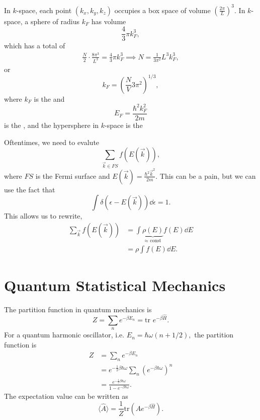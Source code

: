 \documentclass{article}
\numberwithin{equation}{section}
\begin{document}
In $k$-space, each point $(k_x,k_y,k_z)$ occupies a box space of volume $\left(\frac{2\pi}{L}\right)^3.$ In $k$-space, a sphere of radius $k_F$ has volume 
\begin{equation*}
    \frac{4}{3}\pi k_F^3,
\end{equation*}
which has a total of 
\begin{align*}
    \frac{N}{2} \cdot \frac{8\pi^3}{L^3} = \frac{4}{3}\pi k_F^3 \implies N = \frac{1}{3\pi^2} L^3k_F^3,
\end{align*}
or 
\begin{equation*}
    k_F = \left(\frac{N}{V}3\pi^2\right)^{1/3},
\end{equation*}
where $k_F$ is the  and
\begin{equation*}
    E_F = \frac{\hbar^2k_F^2}{2m}
\end{equation*}
is the , and the hypersphere in $k$-space is the 
\begin{idea}
    Oftentimes, we need to evalute 
    \begin{equation*}
        \sum_{\vec{k} \in FS} f(E(\vec{k})),
    \end{equation*}
    where $FS$ is the Fermi surface and $E(\vec{k}) = \frac{\hbar^2\vec{k}^2}{2m}.$ This can be a pain, but we can use the fact that 
    \begin{equation*}
        \int \delta(\epsilon - E(\vec{k})) \dd{\epsilon} = 1.
    \end{equation*}
    This allows us to rewrite,
    \begin{align*}
        \sum_{\vec{k}}f(E(\vec{k})) &= \int \underbrace{\rho(E)}_{\approx \text{ const}} f(E) \dd{E} \\ 
        &= \rho \int f(E) \dd{E}.
    \end{align*}
\end{idea}
\section{Quantum Statistical Mechanics}
The partition function in quantum mechanics is 
\begin{equation*}
    Z = \sum_n e^{-\beta E_n} = \text{tr }e^{-\beta \hat{H}}.
\end{equation*}
For a quantum harmonic oscillator, i.e. $E_n=\hbar \omega(n+1/2),$ the partition function is 
\begin{align*}
    Z &= \sum_n e^{-\beta E_n} \\ 
    &= e^{-\frac{1}{2}\beta \hbar\omega}\sum_n \left(e^{-\beta \hbar \omega}\right)^n \\ 
    &= \boxed{\frac{e^{-\frac{1}{2}\beta \hbar\omega}}{1-e^{-\beta \hbar \omega}}}.
\end{align*}
The expectation value can be written as 
\begin{equation*}
    \langle \hat{A}\rangle  = \frac{1}{Z}\text{tr}\left(\hat{A}e^{-\beta \hat{H}}\right).
\end{equation*}
\end{document}

